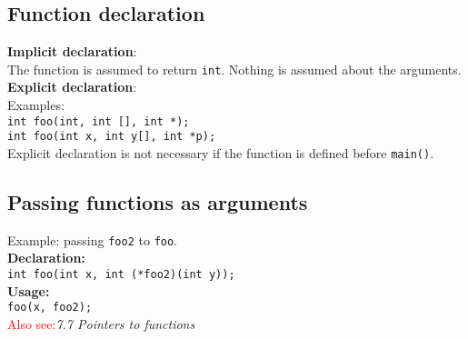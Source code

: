 \subsection{Function declaration}

\textbf{Implicit declaration}:\\
The function is assumed to return \texttt{int}. Nothing is assumed about the arguments.\\
\textbf{Explicit declaration}:\\
Examples:\\
\texttt{int foo(int, int [], int *);}\\
\texttt{int foo(int x, int y[], int *p);}\\
Explicit declaration is not necessary if the function is defined before \texttt{main()}.\\

\subsection{Passing functions as arguments}
Example: passing \texttt{foo2} to \texttt{foo}.\\
\textbf{Declaration:}\\
\texttt{int foo(int x, int (*foo2)(int y));}\\
\textbf{Usage:}\\
\texttt{foo(x, foo2);}\\
\textcolor{red}{Also see:}\textit{7.7 Pointers to functions} 
\vfill \null
\columnbreak

